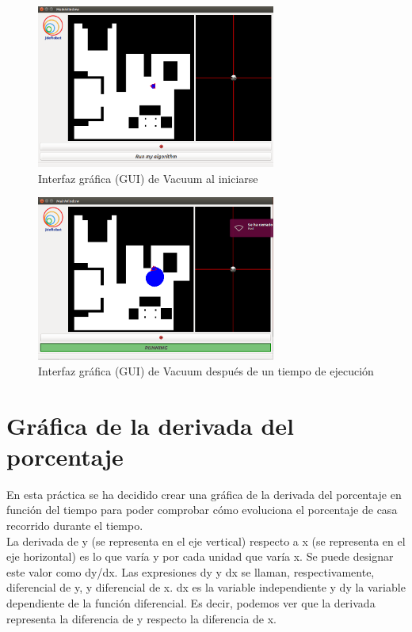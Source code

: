 \begin{figure}[H]
  \begin{center}
    \includegraphics[width=0.7\textwidth]{figures/Vacuum/GUI_Vacuum.png}
		\caption{Interfaz gráfica (GUI) de Vacuum al iniciarse}
		\label{fig.GUI_Vacuum}
		\end{center}
\end{figure}

\begin{figure}[H]
  \begin{center}
    \includegraphics[width=0.7\textwidth]{figures/Vacuum/GUI2.png}
		\caption{Interfaz gráfica (GUI) de Vacuum después de un tiempo de ejecución}
		\label{fig.GUI2}
		\end{center}
\end{figure}

\section{Gráfica de la derivada del porcentaje}
En esta práctica se ha decidido crear una gráfica de la derivada del porcentaje en función del tiempo para poder comprobar cómo evoluciona el porcentaje de casa recorrido durante el tiempo.\\

La derivada de y (se representa en el eje vertical) respecto a x (se representa en el eje horizontal) es lo que varía y por cada unidad que varía x. Se puede designar este valor como dy/dx. Las expresiones dy y dx se llaman, respectivamente, diferencial de y, y diferencial de x. dx es la variable independiente y dy la variable dependiente de la función diferencial. Es decir, podemos ver que la derivada representa la diferencia de y respecto la diferencia de x. \\

